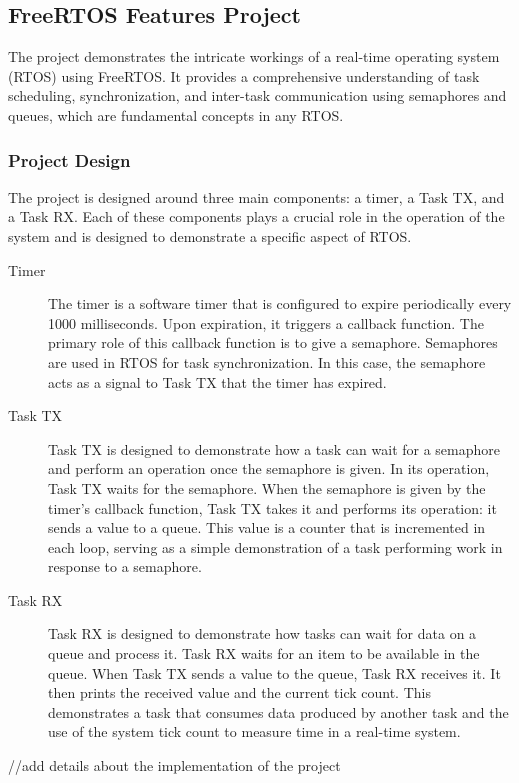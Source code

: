 \subsection{FreeRTOS Features Project}

The project demonstrates the intricate workings of a real-time operating system (RTOS) using FreeRTOS. It provides a comprehensive understanding of task scheduling, synchronization, and inter-task communication using semaphores and queues, which are fundamental concepts in any RTOS.

\subsubsection{Project Design}

The project is designed around three main components: a timer, a Task TX, and a Task RX. Each of these components plays a crucial role in the operation of the system and is designed to demonstrate a specific aspect of RTOS.

\begin{description}
\item[Timer] The timer is a software timer that is configured to expire periodically every 1000 milliseconds. Upon expiration, it triggers a callback function. The primary role of this callback function is to give a semaphore. Semaphores are used in RTOS for task synchronization. In this case, the semaphore acts as a signal to Task TX that the timer has expired.
\item[Task TX] Task TX is designed to demonstrate how a task can wait for a semaphore and perform an operation once the semaphore is given. In its operation, Task TX waits for the semaphore. When the semaphore is given by the timer's callback function, Task TX takes it and performs its operation: it sends a value to a queue. This value is a counter that is incremented in each loop, serving as a simple demonstration of a task performing work in response to a semaphore.
\item[Task RX] Task RX is designed to demonstrate how tasks can wait for data on a queue and process it. Task RX waits for an item to be available in the queue. When Task TX sends a value to the queue, Task RX receives it. It then prints the received value and the current tick count. This demonstrates a task that consumes data produced by another task and the use of the system tick count to measure time in a real-time system.
\end{description}

//add details about the implementation of the project
